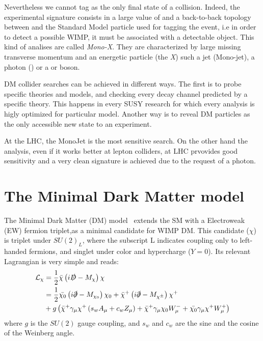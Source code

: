 Nevertheless we cannot tag \met as the only final state of a collision. Indeed, the experimental signature consists in a large value of \met and a back-to-back topology between \met and the Standard Model particle used for tagging the event, i.e in order to detect a possible WIMP, it must be associated with a detectable object. This kind of analises are called \emph{Mono-X}. They are characterized by large missing transverse momentum and an energetic particle (the \emph{X}) such a jet (Mono-jet), a photon (\mph) or a \Wboson or \Zboson boson.

DM collider searches can be achieved in different ways. The first is to probe specific theories and models, and checking every decay channel predicted by a specific theory. This happens in every SUSY research for which every analysis is higly optimized for particular model. Another way is to reveal DM particles as the only accessible new state to an experiment.


At the LHC, the MonoJet is the most sensitive search. On the other hand the \mph analysis, even if it works better at lepton colliders, at LHC prvovides good sensitivity and a very clean signature is achieved due to the request of a photon.

\section{The Minimal Dark Matter model}
The Minimal Dark Matter (DM) model~\cite{Cirelli:paper} extends the SM with a Electroweak (EW) fermion triplet,as a minimal candidate for WIMP DM. This candidate ($\chi$) is triplet under $SU(2)_L$, where the subscript L indicates coupling only to left-handed fermions, and singlet under color and hypercharge ($Y=0$). Its relevant Lagrangian is very simple and reads:
\begin{equation}
\begin{split}
\mathcal{L}_\chi&=\frac{1}{2}\bar{\chi}\left(i\slashed{D}-M_\chi\right)\chi \\
			&= \frac{1}{2}\bar{\chi_0}\left(i\slashed{\partial}-M_{\chi_0}\right)\chi_0+\bar{\chi}^+\left(i\slashed{\partial}-M_{\chi^\pm}\right)\chi^+ \\
			&+ g \left(\bar{\chi}^+\gamma_\mu\chi^+\left(s_w A_\mu + c_w Z_\mu \right) +\bar{\chi}^+ \gamma_\mu\chi_0W^-_\mu + \bar{\chi_0}\gamma_\mu\chi^+W^+_\mu \right)
\end{split}
\end{equation}
where $g$ is the $SU(2)$ gauge coupling, and $s_w$ and $c_w$ are the sine and the cosine of the Weinberg angle.


